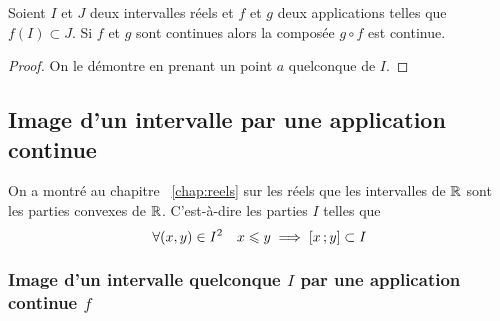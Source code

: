 \begin{prop}
  Soient \(I\) et \(J\) deux intervalles réels et \(f\) et \(g\) deux 
  applications telles que \(f(I) \subset J\). Si \(f\) et \(g\) sont continues 
  alors la composée \(g \circ f\) est continue.
\end{prop}
\begin{proof}
  On le démontre en prenant un point \(a\) quelconque de \(I\).
\end{proof}

\subsection{Image d'un intervalle par une application continue}

\begin{rappel}
  On a montré au chapitre~
  \ref{chap:reels} sur les réels que les intervalles de \(\mathbb{R}\) sont les parties 
  convexes de \(\mathbb{R}\). C'est-à-dire les parties \(I\) telles que
  \begin{equation}
    \forall (x,y) \in I^2 \quad x \leqslant y \implies \left[ x \, ;  y \right] 
    \subset I
  \end{equation}
\end{rappel}

\subsubsection[Image continue d'un intervalle quelconque]{Image d'un intervalle 
quelconque \(I\) par une application continue \(f\)}

